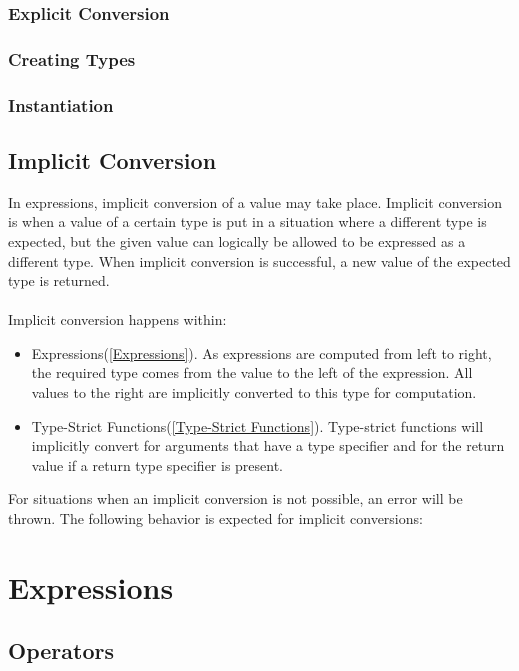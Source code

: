 \documentclass[12pt,letterpaper]{report}
\begin{document}
\subsection{Explicit Conversion}\label{Explicit Conversion}
\subsection{Creating Types}\label{Creating Types}
\subsection{Instantiation}\label{Instantiation}
\section{Implicit Conversion}\label{Implicit Conversion}

In expressions, implicit conversion of a value may take place. Implicit conversion is when 
a value of a certain type is put in a situation where a different type is expected, but the 
given value can logically be allowed to be expressed as a different type. When implicit 
conversion is successful, a new value of the expected type is returned.
\\\\
Implicit conversion happens within:
\begin{itemize}
  \item Expressions(\autoref{Expressions}). As expressions are computed from left to right, the required type comes from the value to the left of the expression. All values to the right are implicitly converted to this type for computation.
  \item Type-Strict Functions(\autoref{Type-Strict Functions}). Type-strict functions will implicitly convert for arguments that have a type specifier and for the return value if a return type specifier is present.
\end{itemize}

For situations when an implicit conversion is not possible, an error will be thrown.
The following behavior is expected for implicit conversions:




\chapter{Expressions}\label{Expressions}
\section{Operators}\label{Operators}
\end{document}
